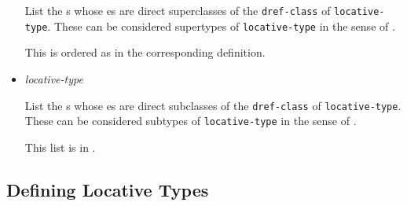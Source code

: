 \begin{itemize}
  List the
  s whose
  es
  are direct superclasses of the \texttt{dref-class} of
  \texttt{locative-type}. These can be considered supertypes of
  \texttt{locative-type} in the sense of
  .

  This is ordered as in the corresponding definition.
\item
  \label{x-28DREF-EXT-3ALOCATIVE-TYPE-DIRECT-SUBS-20FUNCTION-29}
  \emph{locative-type}

  List the
  s whose
  es
  are direct subclasses of the \texttt{dref-class} of
  \texttt{locative-type}. These can be considered subtypes of
  \texttt{locative-type} in the sense of
  .

  This list is in
  .
\end{itemize}

\subsection{Defining Locative Types}\label{defining-locative-types}

\label{x-28DREF-EXT-3A-40DEFINING-LOCATIVE-TYPES-20MGL-PAX-3ASECTION-29}

